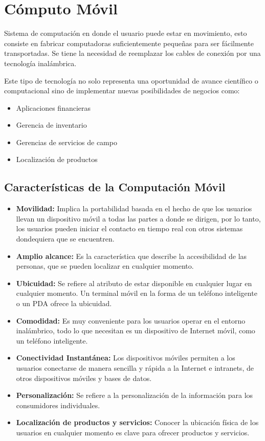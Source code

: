 \section{Cómputo Móvil}

Sistema de computación en donde el usuario puede estar en movimiento, esto consiste en fabricar computadoras suficientemente pequeñas para ser fácilmente transportadas. Se tiene la necesidad de reemplazar los cables de conexión por una tecnología inalámbrica.

Este tipo de tecnología no solo representa una oportunidad de avance científico o computacional sino de implementar nuevas posibilidades de negocios como:

\begin{itemize}
	\item Aplicaciones financieras
	\item Gerencia de inventario
	\item Gerencias de servicios de campo
	\item Localización de productos
\end{itemize}

\subsection{Características de la Computación Móvil}

\begin{itemize}
	\item \textbf{Movilidad: }Implica la portabilidad basada en el hecho de que los usuarios llevan un dispositivo móvil a todas las partes a donde se dirigen, por lo tanto, los usuarios pueden iniciar el contacto en tiempo real con otros sistemas dondequiera que se encuentren.
	\item \textbf{Amplio alcance: }Es la característica que describe la accesibilidad de las personas, que se pueden localizar en cualquier momento.
	\item \textbf{Ubicuidad: }Se refiere al atributo de estar disponible en cualquier lugar en cualquier momento. Un terminal móvil en la forma de un teléfono inteligente o un PDA ofrece la ubicuidad.
	\item \textbf{Comodidad: }Es muy conveniente para los usuarios operar en el entorno inalámbrico, todo lo que necesitan es un dispositivo de Internet móvil, como un teléfono inteligente.
	\item \textbf{Conectividad Instantánea: }Los dispositivos móviles permiten a los usuarios conectarse de manera sencilla y rápida a la Internet e intranets, de otros dispositivos móviles y bases de datos.
	\item \textbf{Personalización: }Se refiere a la personalización de la información para los consumidores individuales.
    	\item \textbf{Localización de productos y servicios: }Conocer la ubicación física de los usuarios en cualquier momento es clave para ofrecer productos y servicios.
\end{itemize}